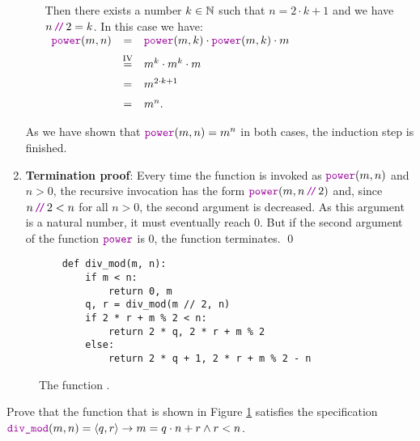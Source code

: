 \begin{enumerate}
\begin{enumerate}
            Then there exists a number $k \in {\mathbb N}$ such that $n = 2 \cdot k + 1$ and we have
            $n \dv 2 = k$.  In this case we have:
            \\[0.2cm]
            \hspace*{1.3cm}
            $ 
            \begin{array}{lcl}
            \mytt{power}(m,n) & = & \mytt{power}(m,k) \cdot \mytt{power}(m,k) \cdot m  \\[0.2cm]
                                & \stackrel{\mathrm{IV}}{=} & m^k \cdot m^k \cdot m  \\[0.2cm]
                                & = & m^{2\cdot k+1} \\[0.2cm]
                                & = & m^{n}.
            \end{array}
            $
      \end{enumerate}
      As we have shown that $\mytt{power}(m,n) = m^n$ in both cases, the induction step is finished. \mycheck
\item \textbf{Termination proof}:
      Every time the function  is invoked as $\mytt{power}(m, n)$ and $n > 0$, the recursive
      invocation has the form $\mytt{power}(m,n \dv 2)$ and, since $n \dv 2 < n$ for all $n > 0$, the second
      argument is decreased.  As this argument is a natural number, it must eventually reach $0$.  But if the
      second argument of the function $\mytt{power}$ is $0$, the function terminates. \mycheck
      \qed
\end{enumerate}

\begin{figure}[!h]
  \centering
\begin{verbatim}
    def div_mod(m, n):
        if m < n:
            return 0, m
        q, r = div_mod(m // 2, n)
        if 2 * r + m % 2 < n:
            return 2 * q, 2 * r + m % 2
        else:
            return 2 * q + 1, 2 * r + m % 2 - n                
\end{verbatim}
\vspace*{-0.3cm}
  \caption{The function .}
  \label{fig:div_mod}
\end{figure} 

\exercise
Prove that the function  that is shown in Figure \ref{fig:div_mod} satisfies the specification
\\[0.2cm]
\hspace*{1.3cm}
$\mytt{div\_mod}(m, n) = \langle q, r \rangle \rightarrow m = q \cdot n + r \wedge r < n$. \eoxs


